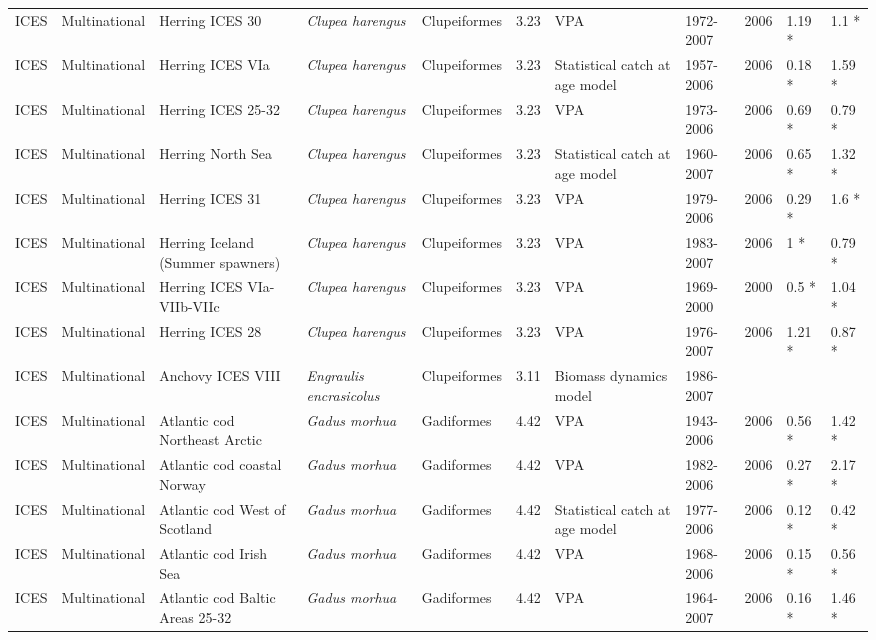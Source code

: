 \begin{longtable}{p{1.5cm}p{1.5cm}p{3cm}p{3cm}p{2.5cm}p{0.9cm}p{1.4cm}p{0.9cm}p{0.9cm}p{0.9cm}p{1cm}}
  ICES & Multinational & Herring ICES 30 & \textit{Clupea harengus} & Clupeiformes & 3.23 & VPA & 1972-2007 & 2006 & 1.19 * & 1.1 * \\ 
  ICES & Multinational & Herring ICES VIa & \textit{Clupea harengus} & Clupeiformes & 3.23 & Statistical catch at age model & 1957-2006 & 2006 & 0.18 * & 1.59 * \\ 
  ICES & Multinational & Herring ICES 25-32 & \textit{Clupea harengus} & Clupeiformes & 3.23 & VPA & 1973-2006 & 2006 & 0.69 * & 0.79 * \\ 
  ICES & Multinational & Herring North Sea & \textit{Clupea harengus} & Clupeiformes & 3.23 & Statistical catch at age model & 1960-2007 & 2006 & 0.65 * & 1.32 * \\ 
  ICES & Multinational & Herring ICES 31 & \textit{Clupea harengus} & Clupeiformes & 3.23 & VPA & 1979-2006 & 2006 & 0.29 * & 1.6 * \\ 
  ICES & Multinational & Herring Iceland (Summer spawners) & \textit{Clupea harengus} & Clupeiformes & 3.23 & VPA & 1983-2007 & 2006 & 1 * & 0.79 * \\ 
  ICES & Multinational & Herring ICES VIa-VIIb-VIIc & \textit{Clupea harengus} & Clupeiformes & 3.23 & VPA & 1969-2000 & 2000 & 0.5 * & 1.04 * \\ 
  ICES & Multinational & Herring ICES 28 & \textit{Clupea harengus} & Clupeiformes & 3.23 & VPA & 1976-2007 & 2006 & 1.21 * & 0.87 * \\ 
  ICES & Multinational & Anchovy ICES VIII & \textit{Engraulis encrasicolus} & Clupeiformes & 3.11 & Biomass dynamics model & 1986-2007 &  &  &  \\ 
  ICES & Multinational & Atlantic cod Northeast Arctic & \textit{Gadus morhua} & Gadiformes & 4.42 & VPA & 1943-2006 & 2006 & 0.56 * & 1.42 * \\ 
  ICES & Multinational & Atlantic cod coastal Norway & \textit{Gadus morhua} & Gadiformes & 4.42 & VPA & 1982-2006 & 2006 & 0.27 * & 2.17 * \\ 
  ICES & Multinational & Atlantic cod West of Scotland & \textit{Gadus morhua} & Gadiformes & 4.42 & Statistical catch at age model & 1977-2006 & 2006 & 0.12 * & 0.42 * \\ 
  ICES & Multinational & Atlantic cod Irish Sea & \textit{Gadus morhua} & Gadiformes & 4.42 & VPA & 1968-2006 & 2006 & 0.15 * & 0.56 * \\ 
  ICES & Multinational & Atlantic cod Baltic Areas 25-32 & \textit{Gadus morhua} & Gadiformes & 4.42 & VPA & 1964-2007 & 2006 & 0.16 * & 1.46 * \\ 

\end{longtable}
